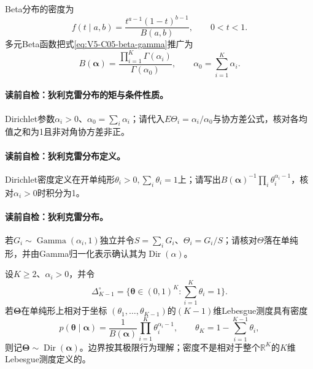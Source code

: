 Beta分布的密度为
\[
f(t\mid a,b)=\frac{t^{a-1}(1-t)^{b-1}}{B(a,b)},
\qquad 0<t<1.
\]
多元Beta函数把式\eqref{eq:V5-C05-beta-gamma}推广为
\begin{equation}\label{eq:V5-C05-multivariate-beta}
B(\boldsymbol\alpha)
=\frac{\prod_{i=1}^K\Gamma(\alpha_i)}
{\Gamma(\alpha_0)},
\qquad \alpha_0=\sum_{i=1}^K\alpha_i.
\end{equation}

\paragraph{读前自检：狄利克雷分布的矩与条件性质。}Dirichlet参数$\alpha_i>0$、$\alpha_0=\sum_i\alpha_i$；请代入$E\Theta_i=\alpha_i/\alpha_0$与协方差公式，核对各均值之和为1且非对角协方差非正。\par
\paragraph{读前自检：狄利克雷分布定义。}Dirichlet密度定义在开单纯形$\theta_i>0,\sum_i\theta_i=1$上；请写出$B(\boldsymbol\alpha)^{-1}\prod_i\theta_i^{\alpha_i-1}$，核对$\alpha_i>0$时积分为1。\par



\paragraph{读前自检：狄利克雷分布。}若$G_i\sim\operatorname{Gamma}(\alpha_i,1)$独立并令$S=\sum_iG_i$、$\Theta_i=G_i/S$；请核对$\Theta$落在单纯形，并由Gamma归一化表示确认其为$\operatorname{Dir}(\alpha)$。\par

\begin{definition}[狄利克雷分布]\label{def:V5-C05-dirichlet}
设$K\ge2$、$\alpha_i>0$，并令
\[
\Delta_{K-1}^{\circ}
=\{\boldsymbol\theta\in(0,1)^K:
\textstyle\sum_{i=1}^K\theta_i=1\}.
\]
若$\boldsymbol\Theta$在单纯形上相对于坐标
$(\theta_1,\ldots,\theta_{K-1})$的$(K-1)$维Lebesgue测度具有密度
\begin{equation}\label{eq:V5-C05-dirichlet-density}
p(\boldsymbol\theta\mid\boldsymbol\alpha)
=\frac1{B(\boldsymbol\alpha)}
\prod_{i=1}^K\theta_i^{\alpha_i-1},
\qquad
\theta_K=1-\sum_{i=1}^{K-1}\theta_i,
\end{equation}
则记$\boldsymbol\Theta\sim\operatorname{Dir}(\boldsymbol\alpha)$。边界按其极限行为理解；密度不是相对于整个$\mathbb R^K$的$K$维Lebesgue测度定义的。
\end{definition}


